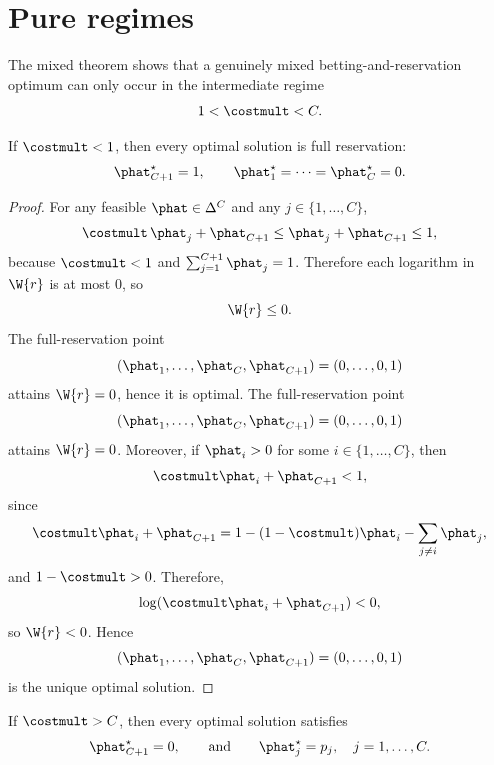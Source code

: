 \section{Pure regimes}

The mixed theorem shows that a genuinely mixed betting-and-reservation optimum can only occur in the intermediate regime
\[
    1<\costmult<C.
\]

\begin{theorem}
    If \(\costmult<1\), then every optimal solution is full reservation:
    \[
        \phat_{C+1}^\star=1,
        \qquad
        \phat_1^\star=\cdots=\phat_C^\star=0.
    \]
\end{theorem}

\begin{proof}
    For any feasible \(\phat\in\Delta^C\) and any \(j\in\{1,\ldots,C\}\),
    \[
        \costmult\,\phat_j+\phat_{C+1}
        \le \phat_j+\phat_{C+1}
        \le 1,
    \]
    because \(\costmult<1\) and \(\sum_{j=1}^{C+1}\phat_j=1\).
    Therefore each logarithm in \(\W{r}\) is at most \(0\), so
    \[
        \W{r}\le 0.
    \]
    The full-reservation point
    \[
        (\phat_1,\ldots,\phat_C,\phat_{C+1})=(0,\ldots,0,1)
    \]
    attains \(\W{r}=0\), hence it is optimal.
    The full-reservation point
    \[
        (\phat_1,\ldots,\phat_C,\phat_{C+1})
        =(0,\ldots,0,1)
    \]
    attains \(\W{r}=0\). Moreover, if \(\phat_i>0\) for some
    \(i\in\{1,\ldots,C\}\), then
    \[
        \costmult\phat_i+\phat_{C+1}<1,
    \]
    since
    \[
        \costmult\phat_i+\phat_{C+1}
        =
        1-(1-\costmult)\phat_i
        -\sum_{j\neq i}\phat_j,
    \]
    and \(1-\costmult>0\). Therefore,
    \[
        \log(\costmult\phat_i+\phat_{C+1})<0,
    \]
    so \(\W{r}<0\). Hence
    \[
        (\phat_1,\ldots,\phat_C,\phat_{C+1})
        =(0,\ldots,0,1)
    \]
    is the unique optimal solution.
\end{proof}
\begin{theorem}
    If \(\costmult>C\), then every optimal solution satisfies
    \[
        \phat_{C+1}^\star=0,
        \qquad\text{and}\qquad
        \phat_j^\star=p_j,
        \quad
        j=1,\ldots,C.
    \]
\end{theorem}

